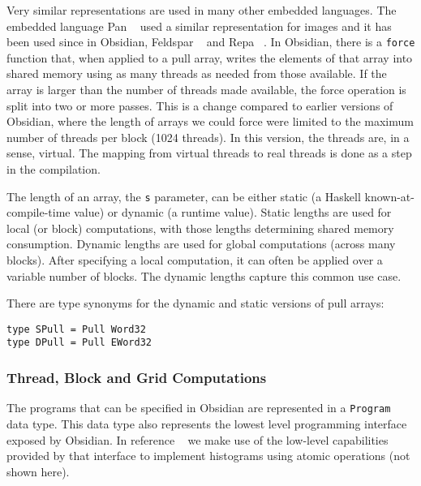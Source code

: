 Very similar representations are used 
in many other embedded languages. The 
embedded language Pan ~ used a similar representation for 
images and it has been used since in Obsidian, Feldspar ~ 
and Repa ~. In Obsidian, there is a {\tt force} function that,
when applied to a pull array, writes the elements of that array 
into shared memory using as many threads as needed from those available. 
If the array is larger than the number of threads made available, the 
force operation is split into two or more passes. This is a change compared
to earlier versions of Obsidian, where the length of arrays we could force 
were limited to the maximum number of threads per block (1024 threads). In 
this version, the threads are, in a sense, virtual. The mapping from virtual 
threads to real threads is done as a step in the compilation.  


The length of an array, the {\tt s} parameter,
can be either static (a Haskell known-at-compile-time value) or dynamic 
(a runtime value). Static lengths are used for local (or block) 
computations, with those lengths determining shared memory consumption. Dynamic 
lengths are used for global computations (across many blocks). After specifying 
a local computation, it can often be applied over a variable number of blocks. 
The dynamic lengths capture this common use case.

There are type synonyms for the dynamic and static versions of  pull arrays: \label{pag:HLSTATIC}

\begin{small}
\begin{verbatim}
type SPull = Pull Word32 
type DPull = Pull EWord32 
\end{verbatim}
\end{small} 

\subsubsection{Thread, Block and Grid Computations} 
\label{sec:Program}

The programs that can be specified in Obsidian are represented in a {\tt Program} data type.
This data type also represents the lowest level programming interface 
exposed by Obsidian. In reference ~ we make use of the low-level 
capabilities provided by that interface to implement histograms using atomic 
operations (not shown here). 


